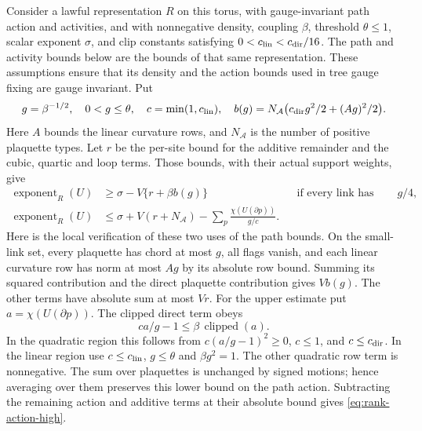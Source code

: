 Consider a lawful representation $R$ on this torus, with gauge-invariant
path action and activities, and with nonnegative density,
coupling $\beta$, threshold $\theta\le1$, scalar exponent $\sigma$, and
clip constants satisfying $0<c_{\rm lin}<c_{\rm dir}/16$.
The path and activity bounds below are the bounds of that same
representation. These assumptions ensure that its density and the
action bounds used in tree gauge fixing are gauge invariant. Put
\[
 g=\beta^{-1/2},\quad 0<g\le\theta,\quad
 c=\min(1,c_{\rm lin}),\quad
 b(g)=N_{\mathcal A}\bigl(c_{\rm dir}g^2/2+(Ag)^2/2\bigr).
\]
Here $A$ bounds the linear curvature rows, and $N_{\mathcal A}$ is the
number of positive plaquette types. Let $r$ be the per-site bound for
the additive remainder and the cubic, quartic and loop terms. Those
bounds, with their actual support weights, give
\begin{align}
 \operatorname{exponent}_R(U)&\ge\sigma-V\{r+\beta b(g)\}
       &&\text{if every link has chord at most }g/4,
       \label{eq:rank-action-low}\\
 \operatorname{exponent}_R(U)&\le\sigma+V(r+N_{\mathcal A})
                  -\sum_p\frac{\chi(U(\partial p))}{g/c}.
       \label{eq:rank-action-high}
\end{align}
Here is the local verification of these two uses of the path bounds.
On the small-link set, every plaquette has chord at most $g$, all flags
vanish, and each linear curvature row has norm at most $Ag$ by its
absolute row bound. Summing its squared contribution and the direct
plaquette contribution gives $Vb(g)$. The other terms have absolute
sum at most $Vr$.
For the upper estimate put $a=\chi(U(\partial p))$. The clipped direct
term obeys
\[
             ca/g-1\le\beta\,\operatorname{clipped}(a).
\]
In the quadratic region this follows from
$c(a/g-1)^2\ge0$, $c\le1$, and $c\le c_{\rm dir}$.
In the linear region use $c\le c_{\rm lin}$, $g\le\theta$ and
$\beta g^2=1$. The other quadratic row term is nonnegative.
The sum over plaquettes is unchanged by signed motions; hence averaging
over them preserves this lower bound on the path action. Subtracting
the remaining action and additive terms at their absolute bound gives
\eqref{eq:rank-action-high}.

